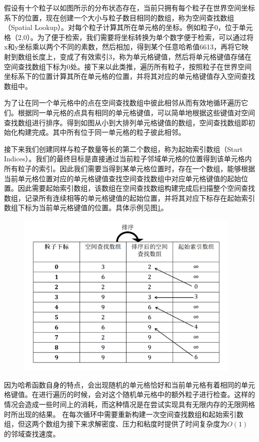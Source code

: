 假设有十个粒子以如图所示的分布状态存在，当前只拥有每个粒子在世界空间坐标系下的位置，现在创建一个大小与粒子数目相同的数组，称为空间查找数组（Spatial Lookup）。对每个粒子计算其所在单元格的坐标。例如粒子0，位于单元格（2,0）。为了便于检索，我们需要将坐标转换为单个数字便于检索，可以通过将x和y坐标乘以两个不同的素数，然后相加，得到某个任意哈希值6613，再将它映射到数组长度上，变成了有效索引3，称为单元格键值，然后将单元格键值存储在空间查找数组下标为0处。接下来以此类推，遍历所有粒子，按照粒子在世界空间坐标系下的位置计算其所在单元格的位置，并将其对应的单元格键值存入空间查找数组中。

为了让在同一个单元格中的点在空间查找数组中彼此相邻从而有效地循环遍历它们。根据同一单元格的点具有相同的单元格键值，可以简单地根据这些键值对空间查找数组进行排序。得到如图从小到大排列单元格键值的数组，空间查找数组即初始化构建完成。其中所有位于同一单元格的粒子彼此相邻。


接下来我们创建同样与粒子数量等长的第二个数组，称为起始索引数组（Start Indices）。我们的最终目标是直接通过当前粒子邻域单元格的位置得到该单元格内所有粒子的索引。因此我们需要当得到某单元格位置时，存在一个数组，能够根据当前单元格位置对应的单元格键值查找空间查找数组中对应单元格键值的起始位置。因此需要起始索引数组，该数组在空间查找数组构建完成后扫描整个空间查找数组，记录所有连续相等的单元格键值的起始位置，并将其对应下标存在起始索引数组下标为当前单元格键值的位置。具体示例见图\ref{fig:gridArray}。
\begin{figure}[H]
    \centering
    \includegraphics[height=8cm]{image/gridArray.png}
    \label{fig:gridArray}
   \end{figure}

因为哈希函数自身的特点，会出现随机的单元格恰好和当前单元格有着相同的单元格键值。在进行遍历的时候，会对这个随机单元格中的额外粒子进行检查。这样的情况会造成一些时间上的消耗，而这种情况是在尝试实现具有无限内存的无限网格时所出现的结果。
在每次循环中需要重新构建一次空间查找数组和起始索引数组，但这两个数组为接下来求解密度、压力和粘度时提供了时间复杂度为$O(1)$的邻域查找速度。

